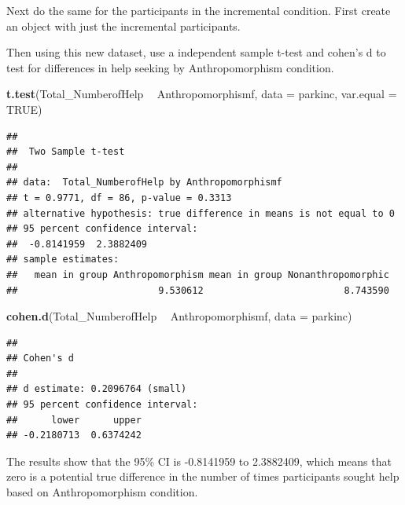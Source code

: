 \documentclass[
]{book}
\newenvironment{Shaded}{\begin{snugshade}}{\end{snugshade}}
\newcommand{\DataTypeTok}[1]{\textcolor[rgb]{0.13,0.29,0.53}{#1}}
\newcommand{\DecValTok}[1]{\textcolor[rgb]{0.00,0.00,0.81}{#1}}
\newcommand{\KeywordTok}[1]{\textcolor[rgb]{0.13,0.29,0.53}{\textbf{#1}}}
\newcommand{\NormalTok}[1]{#1}
\newcommand{\OperatorTok}[1]{\textcolor[rgb]{0.81,0.36,0.00}{\textbf{#1}}}
\newcommand{\OtherTok}[1]{\textcolor[rgb]{0.56,0.35,0.01}{#1}}
\newcommand{\StringTok}[1]{\textcolor[rgb]{0.31,0.60,0.02}{#1}}
\begin{document}
Next do the same for the participants in the incremental condition. First create an object with just the incremental participants.

\begin{Shaded}
\end{Shaded}

Then using this new dataset, use a independent sample t-test and cohen's d to test for differences in help seeking by Anthropomorphism condition.

\begin{Shaded}
\begin{Highlighting}[]
\KeywordTok{t.test}\NormalTok{(Total_NumberofHelp }\OperatorTok{~}\StringTok{ }\NormalTok{Anthropomorphismf, }\DataTypeTok{data =}\NormalTok{ parkinc, }\DataTypeTok{var.equal =} \OtherTok{TRUE}\NormalTok{)}
\end{Highlighting}
\end{Shaded}

\begin{verbatim}
## 
##  Two Sample t-test
## 
## data:  Total_NumberofHelp by Anthropomorphismf
## t = 0.9771, df = 86, p-value = 0.3313
## alternative hypothesis: true difference in means is not equal to 0
## 95 percent confidence interval:
##  -0.8141959  2.3882409
## sample estimates:
##   mean in group Anthropomorphism mean in group Nonanthropomorphic 
##                         9.530612                         8.743590
\end{verbatim}

\begin{Shaded}
\begin{Highlighting}[]
\KeywordTok{cohen.d}\NormalTok{(Total_NumberofHelp }\OperatorTok{~}\StringTok{ }\NormalTok{Anthropomorphismf, }\DataTypeTok{data =}\NormalTok{ parkinc)}
\end{Highlighting}
\end{Shaded}

\begin{verbatim}
## 
## Cohen's d
## 
## d estimate: 0.2096764 (small)
## 95 percent confidence interval:
##      lower      upper 
## -0.2180713  0.6374242
\end{verbatim}

The results show that the 95\% CI is -0.8141959 to 2.3882409, which means that zero is a potential true difference in the number of times participants sought help based on Anthropomorphism condition.
\end{document}
